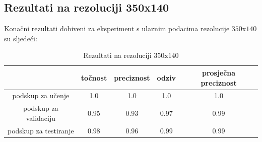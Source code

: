 \documentclass[times, utf8, diplomski, numeric]{fer}
\begin{document}
\subsection{Rezultati na rezoluciji 350x140}
Konačni rezultati dobiveni za eksperiment s ulaznim podacima rezolucije $350$x$140$ su sljedeći:

\begin{table}[H]
\centering
\caption{Rezultati na rezoluciji $350$x$140$}
\label{score:single_hand_350x140}
\begin{tabular}{c|c|c|c|c|}
\cline{2-5}
                                            & točnost & preciznost & odziv & prosječna preciznost \\ \hline
\multicolumn{1}{|c|}{podskup za učenje}     & 1.0       & 1.0        & 1.0     &           1.0           \\ \hline
\multicolumn{1}{|c|}{podskup za validaciju} & 0.95       & 0.93        & 0.97     &            0.99          \\ \hline
\multicolumn{1}{|c|}{podskup za testiranje} & 0.98       & 0.96        & 0.99     &            0.99          \\ \hline
\end{tabular}
\end{table}
\end{document}
